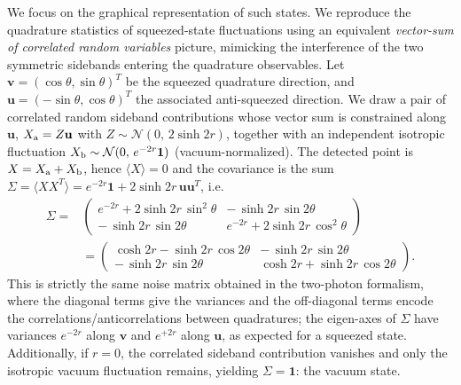 We focus on the graphical representation of such states. We reproduce the quadrature statistics of squeezed-state fluctuations using an
equivalent \textit{vector-sum of correlated random variables} picture, mimicking the interference of the two symmetric sidebands entering the quadrature observables. Let $\mathbf v=(\cos\theta,\sin\theta)^T$ be the squeezed quadrature direction,
and $\mathbf u=(-\sin\theta,\cos\theta)^T$ the associated anti-squeezed direction.
We draw a pair of correlated random sideband contributions whose vector sum is
constrained along $\mathbf u$,
$X_{\rm a}=Z\mathbf u$ with $Z\sim\mathcal N(0,\,2\sinh 2r)$, together with an independent isotropic fluctuation
$X_{\rm b}\sim\mathcal N(0,\,e^{-2r}\mathbf{1})$ (vacuum-normalized). The detected point is $X=X_{\rm a}+X_{\rm b}$, hence $\langle X\rangle=0$ and the covariance is the sum
$\Sigma=\langle XX^{ T}\rangle=e^{-2r}\mathbf 1+2\sinh 2r\,\mathbf u\mathbf u^{ T}$, i.e.
\begin{equation}
\begin{split}
\Sigma= & 
\begin{pmatrix}
e^{-2r}+2\sinh 2r\,\sin^2\theta & -\,\sinh 2r\,\sin 2\theta\\
-\,\sinh 2r\,\sin 2\theta & e^{-2r}+2\sinh 2r\,\cos^2\theta
\end{pmatrix}\\ 
&=
\begin{pmatrix}
\cosh 2r-\sinh 2r\,\cos 2\theta & -\,\sinh 2r\,\sin 2\theta\\
-\,\sinh 2r\,\sin 2\theta & \cosh 2r+\sinh 2r\,\cos 2\theta
\end{pmatrix}.
\end{split}
\label{eq:covariance_squeezed_state}
\end{equation}
This is strictly the same noise matrix obtained in the two-photon formalism, where the diagonal terms give the variances and the off-diagonal terms encode the correlations/anticorrelations between quadratures; the eigen-axes of $\Sigma$ have variances $e^{-2r}$ along $\mathbf v$
and $e^{+2r}$ along $\mathbf u$, as expected for a squeezed state. Additionally, if $r=0$, the correlated sideband contribution vanishes and only
the isotropic vacuum fluctuation remains, yielding $\Sigma=\mathbf 1$: the vacuum state.\\

